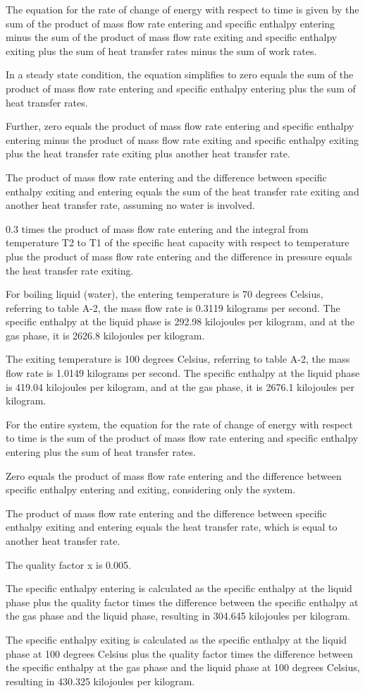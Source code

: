 The equation for the rate of change of energy with respect to time is given by the sum of the product of mass flow rate entering and specific enthalpy entering minus the sum of the product of mass flow rate exiting and specific enthalpy exiting plus the sum of heat transfer rates minus the sum of work rates.

In a steady state condition, the equation simplifies to zero equals the sum of the product of mass flow rate entering and specific enthalpy entering plus the sum of heat transfer rates.

Further, zero equals the product of mass flow rate entering and specific enthalpy entering minus the product of mass flow rate exiting and specific enthalpy exiting plus the heat transfer rate exiting plus another heat transfer rate.

The product of mass flow rate entering and the difference between specific enthalpy exiting and entering equals the sum of the heat transfer rate exiting and another heat transfer rate, assuming no water is involved.

0.3 times the product of mass flow rate entering and the integral from temperature T2 to T1 of the specific heat capacity with respect to temperature plus the product of mass flow rate entering and the difference in pressure equals the heat transfer rate exiting.

For boiling liquid (water), the entering temperature is 70 degrees Celsius, referring to table A-2, the mass flow rate is 0.3119 kilograms per second. The specific enthalpy at the liquid phase is 292.98 kilojoules per kilogram, and at the gas phase, it is 2626.8 kilojoules per kilogram.

The exiting temperature is 100 degrees Celsius, referring to table A-2, the mass flow rate is 1.0149 kilograms per second. The specific enthalpy at the liquid phase is 419.04 kilojoules per kilogram, and at the gas phase, it is 2676.1 kilojoules per kilogram.

For the entire system, the equation for the rate of change of energy with respect to time is the sum of the product of mass flow rate entering and specific enthalpy entering plus the sum of heat transfer rates.

Zero equals the product of mass flow rate entering and the difference between specific enthalpy entering and exiting, considering only the system.

The product of mass flow rate entering and the difference between specific enthalpy exiting and entering equals the heat transfer rate, which is equal to another heat transfer rate.

The quality factor x is 0.005.

The specific enthalpy entering is calculated as the specific enthalpy at the liquid phase plus the quality factor times the difference between the specific enthalpy at the gas phase and the liquid phase, resulting in 304.645 kilojoules per kilogram.

The specific enthalpy exiting is calculated as the specific enthalpy at the liquid phase at 100 degrees Celsius plus the quality factor times the difference between the specific enthalpy at the gas phase and the liquid phase at 100 degrees Celsius, resulting in 430.325 kilojoules per kilogram.